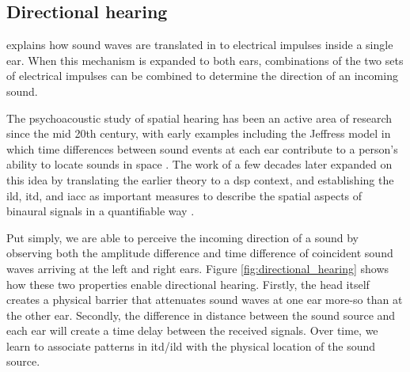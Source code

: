\FloatBarrier

\subsection{Directional hearing}
\label{sec:directional_hearing}
 explains how sound waves are translated in to electrical impulses inside a single ear. When this mechanism is expanded to both ears, combinations of the two sets of electrical impulses can be combined to determine the direction of an incoming sound. 

The psychoacoustic study of spatial hearing has been an active area of research since the mid 20th century, with early examples including the Jeffress model in which time differences between sound events at each ear contribute to a person's ability to locate sounds in space \cite{jeffressPlaceTheorySound1948}. The work of \citeauthor{lindemannEvaluationInterauralSignal1982} a few decades later expanded on this idea by translating the earlier theory to a \gls{dsp} context, and establishing the \gls{ild}, \gls{itd}, and \gls{iacc} as important measures to describe the spatial aspects of binaural signals in a quantifiable way \cite{lindemannEvaluationInterauralSignal1982}.

Put simply, we are able to perceive the incoming direction of a sound by observing both the amplitude difference and time difference of coincident sound waves arriving at the left and right ears. Figure \cref{fig:directional_hearing} shows how these two properties enable directional hearing. Firstly, the head itself creates a physical barrier that attenuates sound waves at one ear more-so than at the other ear. Secondly, the difference in distance between the sound source and each ear will create a time delay between the received signals. Over time, we learn to associate patterns in \gls{itd}/\gls{ild} with the physical location of the sound source.

